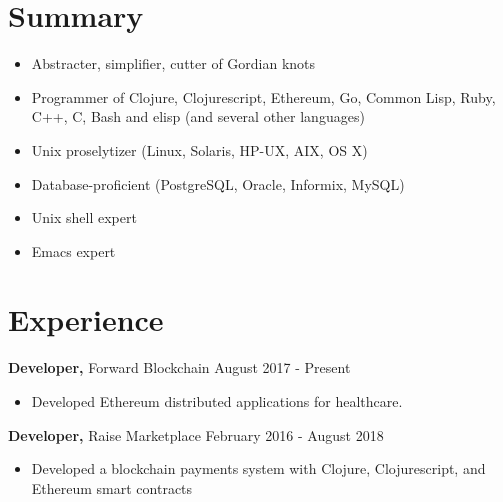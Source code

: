 \documentclass[margin]{res}
\begin{document}
 
 
 
\address{{\bf Home Address} \\ 2446 North Albany Avenue \\ Chicago, IL 60647-2602  \\
        (773) 627-2020 }
\address{{\bf Email Address} \\ me@clojure.us }

 
\begin{resume} 
 
\section{Summary} 
\begin{itemize} \itemsep -2pt %
\item Abstracter, simplifier, cutter of Gordian knots
\item Programmer of Clojure, Clojurescript, Ethereum, Go, Common Lisp, Ruby, C++, C, Bash and elisp (and several other languages)
\item Unix proselytizer (Linux, Solaris, HP-UX, AIX, OS X)
\item Database-proficient (PostgreSQL, Oracle, Informix, MySQL)
\item Unix shell expert
\item Emacs expert
\end{itemize}

\section{Experience}

{\bf Developer,} Forward Blockchain \hfill August 2017 - Present
\begin{itemize} \itemsep -2pt %
\item Developed Ethereum distributed applications for healthcare.
\end{itemize}


{\bf Developer,} Raise Marketplace \hfill February 2016 - August 2018
\begin{itemize} \itemsep -2pt %
\item Developed a blockchain payments system with Clojure, Clojurescript, and Ethereum smart contracts
\end{itemize}



\end{resume}
\end{document}
